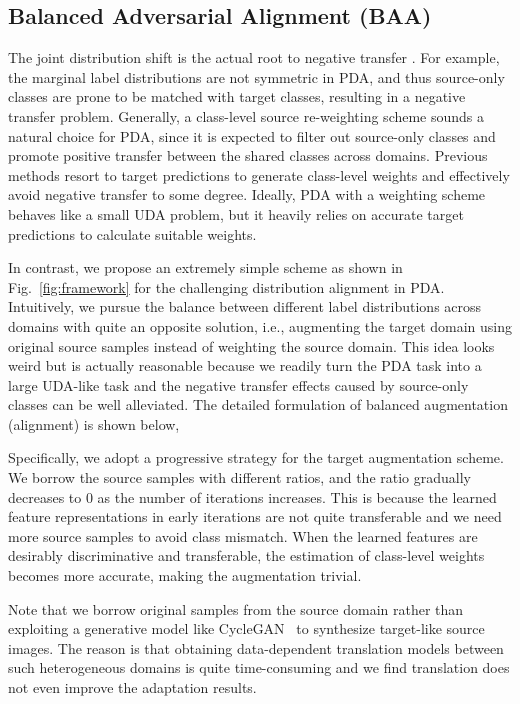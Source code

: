 \documentclass[runningheads]{llncs}
\begin{document}
\subsection{Balanced Adversarial Alignment (BAA)}
\label{sec:baa}
The joint distribution shift is the actual root to negative transfer \cite{wang2019characterizing}. 
For example, the marginal label distributions are not symmetric in PDA, and thus source-only classes are prone to be matched with target classes, resulting in a negative transfer problem. 
Generally, a class-level source re-weighting scheme sounds a natural choice for PDA, since it is expected to filter out source-only classes and promote positive transfer between the shared classes across domains.
Previous methods \cite{cao2018partial,matsuura2018twins} resort to target predictions to generate class-level weights and effectively avoid negative transfer to some degree.
Ideally, PDA with a weighting scheme behaves like a small UDA problem, but it heavily relies on accurate target predictions to calculate suitable weights.
	

In contrast, we propose an extremely simple scheme as shown in Fig.~\ref{fig:framework} for the challenging distribution alignment in PDA.
Intuitively, we pursue the balance between different label distributions across domains with quite an opposite solution, i.e., augmenting the target domain using original source samples instead of weighting the source domain.
This idea looks weird but is actually reasonable because we readily turn the PDA task into a large UDA-like task and the negative transfer effects caused by source-only classes can be well alleviated. 
The detailed formulation of balanced augmentation (alignment) is shown below,

Specifically, we adopt a progressive strategy for the target augmentation scheme. We borrow the source samples with different ratios, and the ratio  gradually decreases to 0 as the number of iterations increases.
This is because the learned feature representations in early iterations are not quite transferable and we need more source samples to avoid class mismatch.
When the learned features are desirably discriminative and transferable, the estimation of class-level weights becomes more accurate, making the augmentation trivial.
	
	
Note that we borrow original samples from the source domain rather than exploiting a generative model like CycleGAN~\cite{zhu2017unpaired} to synthesize target-like source images. 
The reason is that obtaining data-dependent translation models between such heterogeneous domains is quite time-consuming and we find translation does not even improve the adaptation results.
\end{document}
